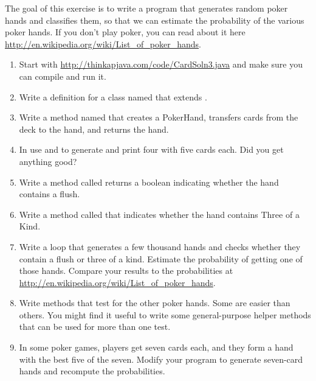 \begin{exercise}
The goal of this exercise is to write a program that generates random poker hands and classifies them, so that we can estimate the
probability of the various poker hands.
If you don't play poker, you can read about it here \url{http://en.wikipedia.org/wiki/List_of_poker_hands}.

\begin{enumerate}

\item Start with \url{http://thinkapjava.com/code/CardSoln3.java} and make sure you can compile and run it.

\item Write a definition for a class named  that extends .

\item Write a  method named  that creates a PokerHand, transfers cards from the deck to the hand, and returns the hand.

\item In  use  and  to generate and print four  with five cards each.
Did you get anything good?

\item Write a  method called  returns a boolean indicating whether the hand contains a flush.

\item Write a method called  that indicates whether the hand contains Three of a Kind.

\item Write a loop that generates a few thousand hands and checks whether they contain a flush or three of a kind.
Estimate the probability of getting one of those hands.
Compare your results to the probabilities at \url{http://en.wikipedia.org/wiki/List_of_poker_hands}.

\item Write methods that test for the other poker hands.
Some are easier than others.
You might find it useful to write some general-purpose helper methods that can be used for more than one test.

\item In some poker games, players get seven cards each, and they form a hand with the best five of the seven.
Modify your program to generate seven-card hands and recompute the probabilities.

\end{enumerate}
\end{exercise}



